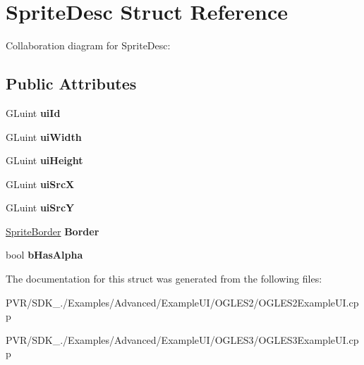 \hypertarget{struct_sprite_desc}{\section{Sprite\+Desc Struct Reference}
\label{struct_sprite_desc}
}


Collaboration diagram for Sprite\+Desc\+:
\subsection*{Public Attributes}
\begin{DoxyCompactItemize}
\item 
\hypertarget{struct_sprite_desc_a30195d80dc117f5f6aec5b9ab4e48d52}{G\+Luint {\bfseries ui\+Id}}\label{struct_sprite_desc_a30195d80dc117f5f6aec5b9ab4e48d52}

\item 
\hypertarget{struct_sprite_desc_a2de071794ab924633b08df1e13c9fbd7}{G\+Luint {\bfseries ui\+Width}}\label{struct_sprite_desc_a2de071794ab924633b08df1e13c9fbd7}

\item 
\hypertarget{struct_sprite_desc_abf6e09440570058260e7502b8b248f72}{G\+Luint {\bfseries ui\+Height}}\label{struct_sprite_desc_abf6e09440570058260e7502b8b248f72}

\item 
\hypertarget{struct_sprite_desc_af8df8b0e81ab201147f02a60548ad506}{G\+Luint {\bfseries ui\+Src\+X}}\label{struct_sprite_desc_af8df8b0e81ab201147f02a60548ad506}

\item 
\hypertarget{struct_sprite_desc_ad72c39739bc833032e646a9ae448ffca}{G\+Luint {\bfseries ui\+Src\+Y}}\label{struct_sprite_desc_ad72c39739bc833032e646a9ae448ffca}

\item 
\hypertarget{struct_sprite_desc_a0b0c7843cc2fb3b786d15140b2ebe5d8}{\hyperlink{struct_sprite_border}{Sprite\+Border} {\bfseries Border}}\label{struct_sprite_desc_a0b0c7843cc2fb3b786d15140b2ebe5d8}

\item 
\hypertarget{struct_sprite_desc_a2e9403e173fa3054399f4cfaa459cf22}{bool {\bfseries b\+Has\+Alpha}}\label{struct_sprite_desc_a2e9403e173fa3054399f4cfaa459cf22}

\end{DoxyCompactItemize}


The documentation for this struct was generated from the following files\+:\begin{DoxyCompactItemize}
\item 
P\+V\+R/\+S\+D\+K\+\_./\+Examples/\+Advanced/\+Example\+U\+I/\+O\+G\+L\+E\+S2/O\+G\+L\+E\+S2\+Example\+U\+I.\+cpp\item 
P\+V\+R/\+S\+D\+K\+\_./\+Examples/\+Advanced/\+Example\+U\+I/\+O\+G\+L\+E\+S3/O\+G\+L\+E\+S3\+Example\+U\+I.\+cpp\end{DoxyCompactItemize}
